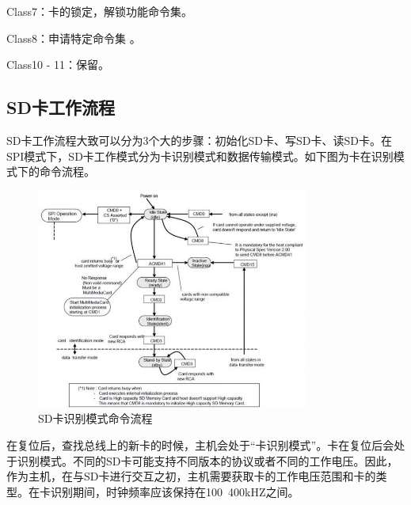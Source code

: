Class7：卡的锁定，解锁功能命令集。

Class8：申请特定命令集 。

Class10 - 11：保留。


\subsection{SD卡工作流程}

SD卡工作流程大致可以分为3个大的步骤：初始化SD卡、写SD卡、读SD卡。在SPI模式下，SD卡工作模式分为卡识别模式和数据传输模式。如下图为卡在识别模式下的命令流程。

\begin{figure}[H]
    \centering
    \includegraphics[width=0.8\textwidth]{figures/06-02-命令流程.png}
    \caption{SD卡识别模式命令流程}
\end{figure}


在复位后，查找总线上的新卡的时候，主机会处于“卡识别模式”。卡在复位后会处于识别模式。不同的SD卡可能支持不同版本的协议或者不同的⼯作电压。因此，作为主机，在与SD卡进行交互之初，主机需要获取卡的工作电压范围和卡的类型。在卡识别期间，时钟频率应该保持在100~400kHZ之间。

